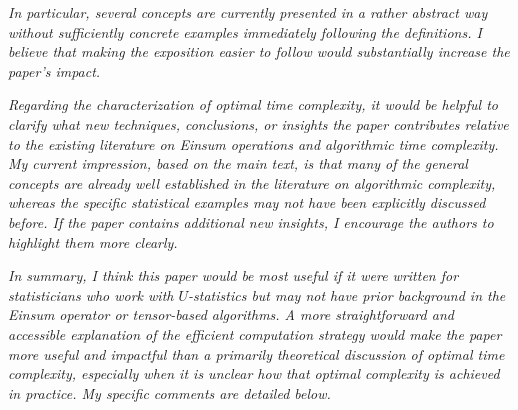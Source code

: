 \documentclass[12pt]{article}
\theoremstyle{plain}
\theoremstyle{definition}
\begin{document}
\emph{In particular, several concepts are currently presented in a rather abstract way without sufficiently concrete examples immediately following the definitions. I believe that making the exposition easier to follow would substantially increase the paper's impact.}

\emph{Regarding the characterization of optimal time complexity, it would be helpful to clarify what new techniques, conclusions, or insights the paper contributes relative to the existing literature on Einsum operations and algorithmic time complexity. My current impression, based on the main text, is that many of the general concepts are already well established in the literature on algorithmic complexity, whereas the specific statistical examples may not have been explicitly discussed before. If the paper contains additional new insights, I encourage the authors to highlight them more clearly.}

\emph{In summary, I think this paper would be most useful if it were written for statisticians who work with $U$-statistics but may not have prior background in the Einsum operator or tensor-based algorithms. A more straightforward and accessible explanation of the efficient computation strategy would make the paper more useful and impactful than a primarily theoretical discussion of optimal time complexity, especially when it is unclear how that optimal complexity is achieved in practice. My specific comments are detailed below.}
\end{document}
